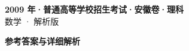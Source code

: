 \documentclass[zihao=-4, a4paper]{ctexart}
\begin{document}
\begin{center}
  {\Large\bfseries 2009 年·普通高等学校招生考试·安徽卷·理科}\\[4pt]
  {\large 数学 · 解析版}
\end{center}
\medskip
{}

\clearpage
{}
\begin{center}{\Large\bfseries 参考答案与详细解析}\end{center}
\medskip

\end{document}
